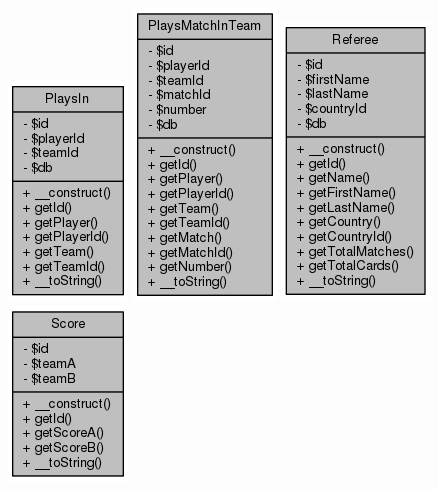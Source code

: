 \documentclass[11pt]{article}
\begin{document}
\includegraphics[scale=0.4]{UML_PlaysIn.png}
\includegraphics[scale=0.4]{UML_PlaysMatchInTeam.png}
\includegraphics[scale=0.4]{UML_Referee.png}
\includegraphics[scale=0.4]{UML_Score.png}
\end{document}
